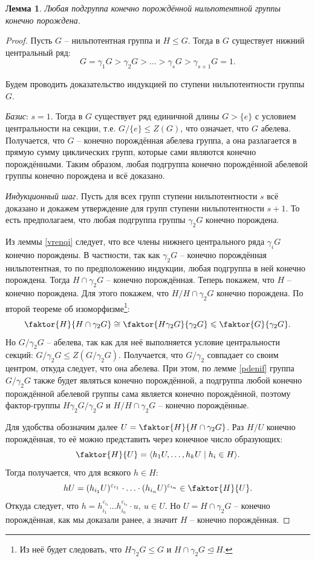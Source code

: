 \documentclass{article}
\newtheorem{lemma}{Лемма}[section]
\begin{document}
\begin{lemma} \label{sderot}
    Любая подгруппа конечно порождённой нильпотентной группы конечно порождена.
\end{lemma}
\begin{proof}
    Пусть $G$ -- нильпотентная группа и $H \leqslant G$. Тогда в $G$ существует нижний центральный ряд:
    \[
        G = \gamma_1 G > \gamma_2 G > \ldots > \gamma_s G > \gamma_{s + 1} G = 1.
    \]

    Будем проводить доказательство индукцией по ступени нильпотентности группы $G$.

    \textit{Базис}: $s = 1$. Тогда в $G$ существует ряд единичной длины $G > \{ e \}$ с условием центральности на секции, т.е. $G / \{ e \} \leqslant  Z(G)$, что означает, что $G$ абелева. Получается, что $G$ -- конечно порождённая абелева группа, а она разлагается в прямую сумму циклических групп, которые сами являются конечно порождёнными. Таким образом, любая подгруппа конечно порождённой абелевой группы конечно порождена и всё доказано.

    \textit{Индукционный шаг.} Пусть для всех групп ступени нильпотентности $s$ всё доказано и докажем утверждение для групп ступени нильпотентности $s + 1$. То есть предполагаем, что любая подгруппа группы $\gamma_2 G$ конечно порождена.

    Из леммы \ref{vrenqi} следует, что все члены нижнего центрального ряда $\gamma_i G$ конечно порождены. В частности, так как $\gamma_2 G$ -- конечно порождённая нильпотентная, то по предположению индукции, любая подгруппа в ней конечно порождена. Тогда $H \cap \gamma_2 G$ -- конечно порождённая.
    Теперь покажем, что $H$ -- конечно порождена. Для этого покажем, что $H / H \cap \gamma_2 G$ конечно порождена.
    По второй теореме об изоморфизме\footnote{Из неё будет следовать, что $H \gamma_2 G \leqslant G$ и $H \cap \gamma_2 G \trianglelefteq H$.}:
    \[
        \faktor{H}{H \cap \gamma_2 G} \cong \faktor{H \gamma_2 G}{\gamma_2 G} \leqslant \faktor{G}{\gamma_2 G}.
    \]
    Но $G / \gamma_2 G$ -- абелева, так как для неё выполняется условие центральности секций: $G / \gamma_2 G \leqslant Z(G / \gamma_2 G)$. Получается, что $G / \gamma_2$ совпадает со своим центром, откуда следует, что она абелева. При этом, по лемме \ref{pdenif} группа $G / \gamma_2 G$ также будет являться конечно порождённой, а подгруппа любой конечно порождённой абелевой группы сама является конечно порождённой, поэтому фактор-группы $H \gamma_2 G / \gamma_2 G$ и $H / H \cap \gamma_2 G$ -- конечно порождённые.

    Для удобства обозначим далее $U = \faktor{H}{H \cap \gamma_2 G}$. Раз $H / U$ конечно порождённая, то её можно представить через конечное число образующих: 
    \[
        \faktor{H}{U} = \langle h_1 U, \ldots, h_k U \mid h_i \in H \rangle.
    \]
    Тогда получается, что для всякого $h \in H$: $$ hU = (h_{i_1}U)^{\varepsilon_{i_1}} \cdot \ldots \cdot (h_{i_n}U)^{\varepsilon_{i_n}} \in \faktor{H}{U}. $$
    Откуда следует, что $ h = h_{i_1}^{\varepsilon_{i_1}} \ldots h_{i_n}^{\varepsilon_{i_n}} \cdot u, \ u \in U. $ Но $U = H \cap \gamma_2 G$ -- конечно порождённая, как мы доказали ранее, а значит $H$ -- конечно порождённая.
\end{proof}
\end{document}
